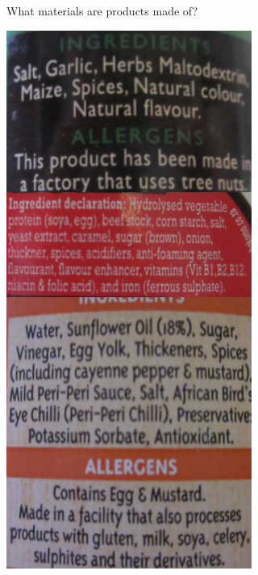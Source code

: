 \begin{activity}{What materials are products made of?}
{\begin{minipage}{.3\textwidth}
\begin{center}
 \includegraphics[height=1.8\textwidth]{photos/food_labels.png}
\end{center}
\end{minipage}

 }  \end{activity}
\par
